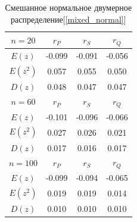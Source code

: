 \documentclass[12pt,a4paper]{article}
\begin{document}
			\begin{table}[htp]
				\label{coeffs_mixed_20}
				\begin{center}
					\begin{tabular}{|c|c|c|c|}
						\hline
						$n=20$ & $r_P$ & $r_S$ & $r_Q$ \\ \hline
						$E(z)$ & -0.099 & -0.091 & -0.056 \\ \hline
						$E(z^2)$ & 0.057 & 0.055 & 0.050 \\ \hline
						$D(z)$ & 0.048 & 0.047 & 0.047 \\ \hline
						
						$n=60$ & $r_P$ & $r_S$ & $r_Q$ \\ \hline
						$E(z)$ & -0.101 & -0.096 & -0.066 \\ \hline
						$E(z^2)$ & 0.027 & 0.026 & 0.021 \\ \hline
						$D(z)$ & 0.017 & 0.016 & 0.017 \\ \hline
						
						$n=100$& $r_P$ & $r_S$ & $r_Q$ \\ \hline
						$E(z)$ & -0.099 & -0.094 & -0.065 \\ \hline
						$E(z^2)$ & 0.019 & 0.019 & 0.014 \\ \hline
						$D(z)$ & 0.010 & 0.010 & 0.010 \\ \hline
					\end{tabular}
				\end{center}
			\caption{Смешанное нормальное двумерное распределение[\ref{mixed_normal}]}
			\end{table}
			\newpage
			
\end{document}
